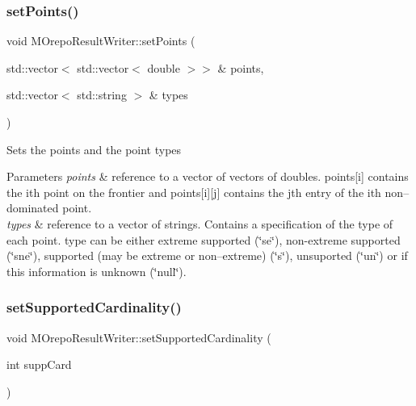 \subsubsection{\texorpdfstring{set\+Points()}{setPoints()}}
{\footnotesize\ttfamily void M\+Orepo\+Result\+Writer\+::set\+Points (\begin{DoxyParamCaption}\item[{std\+::vector$<$ std\+::vector$<$ double $>$$>$ \&}]{points,  }\item[{std\+::vector$<$ std\+::string $>$ \&}]{types }\end{DoxyParamCaption})}

Sets the points and the point types


\begin{DoxyParams}{Parameters}
{\em points} & reference to a vector of vectors of doubles. points\mbox{[}i\mbox{]} contains the i\textquotesingle{}th point on the frontier and points\mbox{[}i\mbox{]}\mbox{[}j\mbox{]} contains the j\textquotesingle{}th entry of the i\textquotesingle{}th non--dominated point. \\
\hline
{\em types} & reference to a vector of strings. Contains a specification of the type of each point. type can be either extreme supported (\char`\"{}se\char`\"{}), non-\/extreme supported (\char`\"{}sne\char`\"{}), supported (may be extreme or non--extreme) (\char`\"{}s\char`\"{}), unsuported (\char`\"{}un\char`\"{}) or if this information is unknown (\char`\"{}null\char`\"{}). \\
\hline
\end{DoxyParams}
\mbox{\label{class_m_orepo_result_writer_aa7392328b02fd0e1c9edcbb16e4d47df}} 
\subsubsection{\texorpdfstring{set\+Supported\+Cardinality()}{setSupportedCardinality()}}
{\footnotesize\ttfamily void M\+Orepo\+Result\+Writer\+::set\+Supported\+Cardinality (\begin{DoxyParamCaption}\item[{int}]{supp\+Card }\end{DoxyParamCaption})\hspace{0.3cm}{\ttfamily [inline]}}

